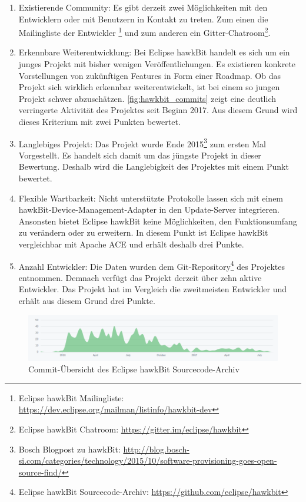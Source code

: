 \begin{enumerate}[label={Nr. \arabic*}, leftmargin=*, labelindent=1em]
 \item Existierende Community:
 Es gibt derzeit zwei Möglichkeiten mit den Entwicklern oder mit Benutzern in Kontakt zu treten. 
 Zum einen die Mailingliste der Entwickler \footnote{Eclipse hawkBit Mailingliste: \url{https://dev.eclipse.org/mailman/listinfo/hawkbit-dev}}
 und zum anderen ein Gitter-Chatroom\footnote{Eclipse hawkBit Chatroom: \url{https://gitter.im/eclipse/hawkbit}}.
  
 \item Erkennbare Weiterentwicklung:
 Bei Eclipse hawkBit handelt es sich um ein junges Projekt mit bisher wenigen Veröffentlichungen.
 Es existieren konkrete Vorstellungen von zukünftigen Features in Form einer Roadmap.
 Ob das Projekt sich wirklich erkennbar weiterentwickelt, ist bei einem so jungen Projekt schwer abzuschätzen.
 \autoref{fig:hawkbit_commits} zeigt eine deutlich verringerte Aktivität des Projektes seit Beginn 2017.
 Aus diesem Grund wird dieses Kriterium mit zwei Punkten bewertet.
 
 \item Langlebiges Projekt:
 Das Projekt wurde Ende 2015\footnote{Bosch Blogpost zu hawkBit: \url{http://blog.bosch-si.com/categories/technology/2015/10/software-provisioning-goes-open-source-find/}}
 zum ersten Mal Vorgestellt. Es handelt sich damit um das jüngste Projekt in dieser Bewertung.
 Deshalb wird die Langlebigkeit des Projektes mit einem Punkt bewertet.

 \item Flexible Wartbarkeit:
 Nicht unterstützte Protokolle lassen sich mit einem hawkBit-Device-Management-Adapter in den Update-Server integrieren. 
 Ansonsten bietet Eclipse hawkBit keine Möglichkeiten, den Funktionsumfang zu verändern oder zu erweitern.
 In diesem Punkt ist Eclipse hawkBit vergleichbar mit Apache ACE und erhält deshalb drei Punkte.
 
 \item Anzahl Entwickler: 
  Die Daten wurden dem Git-Repository\footnote{Eclipse hawkBit Sourcecode-Archiv: \url{https://github.com/eclipse/hawkbit}} des Projektes entnommen.
  Demnach verfügt das Projekt derzeit über zehn aktive Entwickler.
  Das Projekt hat im Vergleich die zweitmeisten Entwickler und erhält aus diesem Grund drei Punkte.
 
\end{enumerate}

\begin{figure}[h]
 \centering
 \includegraphics[scale=0.4]{content/pictures/hawkbit_commits.png}
 \caption{Commit-Übersicht des Eclipse hawkBit Sourcecode-Archiv \cite{hawkbit_git}}
 \label{fig:hawkbit_commits}
\end{figure}

